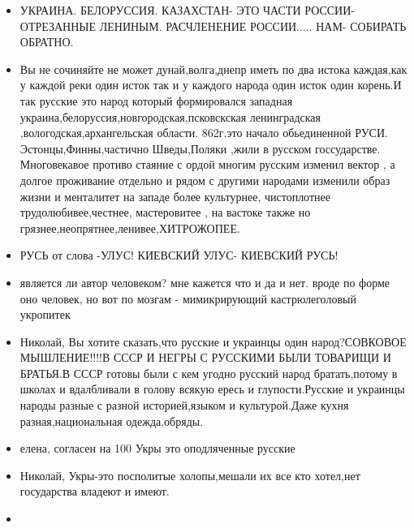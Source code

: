 \begin{itemize}
\item {}

УКРАИНА. БЕЛОРУССИЯ. КАЗАХСТАН- ЭТО ЧАСТИ РОССИИ- ОТРЕЗАННЫЕ ЛЕНИНЫМ. РАСЧЛЕНЕНИЕ РОССИИ..... НАМ- СОБИРАТЬ ОБРАТНО.


\item {}

Вы не сочиняйте не может дунай,волга,днепр иметь по два истока каждая,как у
каждой реки один исток так и у каждого народа один исток один корень.И так
русские это народ который формировался западная
украина,белоруссия,новгородская,псковскская ленинградская
,вологодская,архангельская области. 862г.это начало обьединенной РУСИ.
Эстонцы,Финны,частично Шведы,Поляки ,жили в русском госсударстве. Многовекавое
противо стаяние с ордой многим русским изменил вектор , а долгое проживание
отдельно и рядом с другими народами изменили образ жизни и менталитет на западе
более культурнее, чистоплотнее трудолюбивее,честнее, мастеровитее , на вастоке
также но грязнее,неопрятнее,ленивее,ХИТРОЖОПЕЕ.

\item {}

РУСЬ от слова -УЛУС! КИЕВСКИЙ УЛУС- КИЕВСКИЙ РУСЬ!

\item {}

является ли автор человеком? мне кажется что и да и нет. вроде по форме оно
человек, но вот по мозгам - мимикрирующий кастрюлеголовый укропитек

\item {}

Николай, Вы хотите сказать,что русские и украинцы один народ?СОВКОВОЕ
МЫШЛЕНИЕ!!!!В СССР И НЕГРЫ С РУССКИМИ БЫЛИ ТОВАРИЩИ И БРАТЬЯ.В СССР готовы были
с кем угодно русский народ братать,потому в школах и вдалбливали в голову
всякую ересь и глупости.Русские и украинцы народы разные с разной
историей,языком и культурой.Даже кухня разная,национальная одежда,обряды.

\item {}

елена, согласен на 100 Укры это оподляченные русские

\item {}

Николай, Укры-это посполитые холопы,мешали их все кто хотел,нет государства владеют и имеют.

\item {}


\end{itemize}
